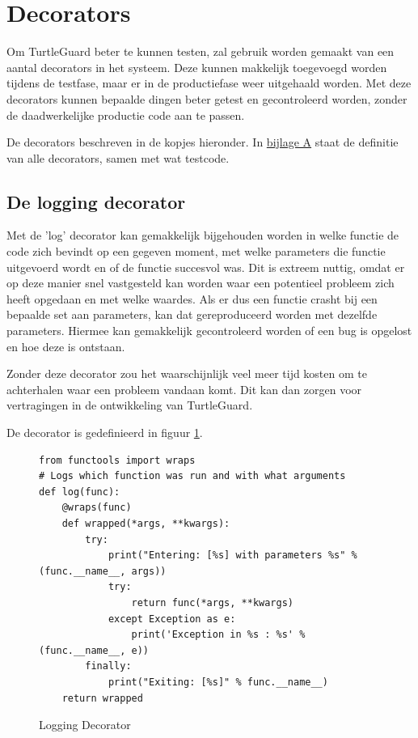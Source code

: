 \documentclass[a4paper]{report}
\newcommand{\turtleguard}{\mbox{TurtleGuard\texttrademark}\xspace}
\begin{document}
\section{Decorators}
\label{sec:decorators}
Om \turtleguard beter te kunnen testen, zal gebruik worden gemaakt van een aantal decorators in het systeem.
Deze kunnen makkelijk toegevoegd worden tijdens de testfase, maar er in de productiefase weer uitgehaald worden.
Met deze decorators kunnen bepaalde dingen beter getest en gecontroleerd worden, zonder de daadwerkelijke productie code aan te passen.
\par\smallskip
De decorators beschreven in de kopjes hieronder. 
In \hyperref[sec:bijlageA]{bijlage A} staat de definitie van alle decorators, samen met wat testcode.


\subsection{De logging decorator}
Met de 'log' decorator kan gemakkelijk bijgehouden worden in welke functie de code zich bevindt op een gegeven moment, met welke parameters die functie uitgevoerd wordt en of de functie succesvol was. 
Dit is extreem nuttig, omdat er op deze manier snel vastgesteld kan worden waar een potentieel probleem zich heeft opgedaan en met welke waardes.
Als er dus een functie crasht bij een bepaalde set aan parameters, kan dat gereproduceerd worden met dezelfde parameters. 
Hiermee kan gemakkelijk gecontroleerd worden of een bug is opgelost en hoe deze is ontstaan.
\par\smallskip 
Zonder deze decorator zou het waarschijnlijk veel meer tijd kosten om te achterhalen waar een probleem vandaan komt.
Dit kan dan zorgen voor vertragingen in de ontwikkeling van \turtleguard.
\par\smallskip
De decorator is gedefinieerd in figuur \ref{fig:decorator_log}.
\begin{figure}[H]
\begin{verbatim}
from functools import wraps
# Logs which function was run and with what arguments
def log(func):
    @wraps(func)
    def wrapped(*args, **kwargs):
        try:
            print("Entering: [%s] with parameters %s" % (func.__name__, args))
            try:
                return func(*args, **kwargs)
            except Exception as e:
                print('Exception in %s : %s' % (func.__name__, e))
        finally:
            print("Exiting: [%s]" % func.__name__)
    return wrapped
\end{verbatim}
\caption{Logging Decorator}
\label{fig:decorator_log}
\end{figure}
\end{document}
